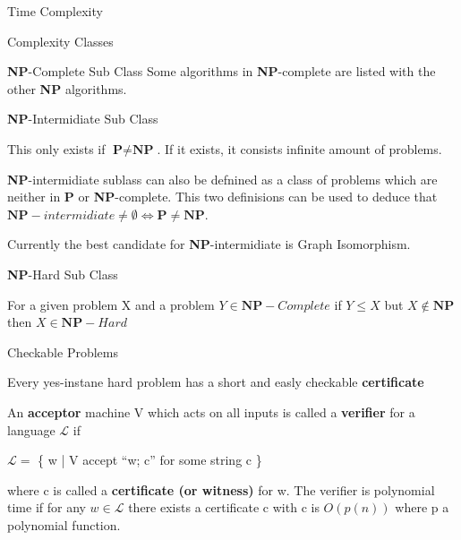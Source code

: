 \documentclass[12pt, letterpaper]{article}
\begin{document}
\begin{section}{Time Complexity}
\begin{subsection}{Complexity Classes}
\begin{subsubsection}{\textbf{NP}-Complete Sub Class}
      Some algorithms in \textbf{NP}-complete are listed with the other \textbf{NP} algorithms.

    \end{subsubsection}

    \begin{subsubsection}{\textbf{NP}-Intermidiate Sub Class}

      This only exists if \(\textbf{P} \neq \textbf{NP}\).
      If it exists, it consists infinite amount of problems.

      \textbf{NP}-intermidiate sublass can also be defnined as a class of
      problems which are neither in \textbf{P} or \textbf{NP}-complete.
      This two definisions can be used to deduce that
      \(\textbf{NP}-intermidiate \neq \emptyset \iff \textbf{P} \neq \textbf{NP}\).

      Currently the best candidate for \textbf{NP}-intermidiate is Graph Isomorphism.

    \end{subsubsection}

    \begin{subsubsection}{\textbf{NP}-Hard Sub Class}

      For a given problem X and a problem \(Y \in \textbf{NP}-Complete\) if
      \(Y \leq X\) but \(X \notin \textbf{NP}\) then \(X \in \textbf{NP}-Hard\)

    \end{subsubsection}

  \end{subsection}

  \begin{subsection}{Checkable Problems}

    Every yes-instane hard problem has a short and easly checkable \textbf{certificate}

    An \textbf{acceptor} machine V which acts on all inputs is called a \textbf{verifier}
    for a language \(\mathscr{L}\) if
    \begin{center}
      \(\mathscr{L} = \) \{{} w | V accept ``w; c'' for some string c \}{}
    \end{center}
    where c is called a \textbf{certificate (or witness)} for w. The verifier is
    polynomial time if for any \(w \in \mathscr{L}\) there exists a certificate
    c with c is \(O(p(n))\) where p a polynomial function.

  \end{subsection}

\end{section}
\end{document}
